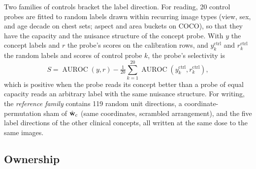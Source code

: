\documentclass{article}
\begin{document}
Two families of controls bracket the label direction. For reading, 20 control probes are fitted to random labels drawn within recurring image types (view, sex, and age decade on chest sets; aspect and area buckets on COCO), so that they have the capacity and the nuisance structure of the concept probe. With $y$ the concept labels and $r$ the probe's scores on the calibration rows, and $y^{\mathrm{ctrl}}_k$ and $r^{\mathrm{ctrl}}_k$ the random labels and scores of control probe $k$, the probe's selectivity is
\begin{equation}
S=\operatorname{AUROC}(y,r)-\tfrac{1}{20}\textstyle\sum_{k=1}^{20}\operatorname{AUROC}(y^{\mathrm{ctrl}}_k,r^{\mathrm{ctrl}}_k),
\label{eq:selectivity}
\end{equation}
which is positive when the probe reads its concept better than a probe of equal capacity reads an arbitrary label with the same nuisance structure. For writing, the \emph{reference family} contains 119 random unit directions, a coordinate-permutation sham of $\hat{\mathbf{w}}_c$ (same coordinates, scrambled arrangement), and the five label directions of the other clinical concepts, all written at the same dose to the same images.

\subsection{Ownership}
\label{sec:ownership}
\end{document}
